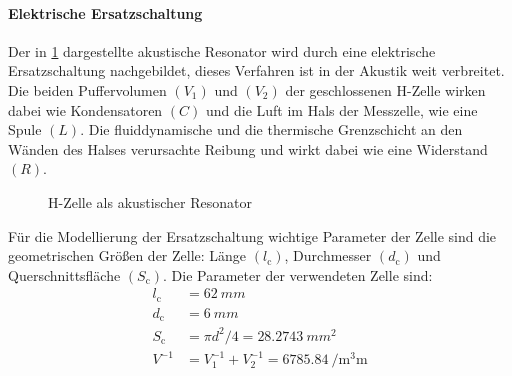 \paragraph{Elektrische Ersatzschaltung}
Der in \cref{fig:AcousticResonator} dargestellte akustische Resonator wird durch eine elektrische Ersatzschaltung nachgebildet, dieses Verfahren ist in der Akustik weit verbreitet.
Die beiden Puffervolumen $(V_1)$ und $(V_2)$ der geschlossenen H-Zelle wirken dabei wie Kondensatoren $(C)$ und die Luft im Hals der Messzelle, wie eine Spule $(L)$.
Die fluiddynamische und die thermische Grenzschicht an den Wänden des Halses verursachte Reibung und wirkt dabei wie eine Widerstand $(R)$.
\begin{figure}
    \centering
    
    \caption{H-Zelle als akustischer Resonator}
    \label{fig:AcousticResonator}
\end{figure}
Für die Modellierung der Ersatzschaltung wichtige Parameter der Zelle sind die geometrischen Größen der Zelle:
Länge $(l_\mathrm{c})$, Durchmesser $(d_\mathrm{c})$ und Querschnittsfläche $(S_\mathrm{c})$.
Die Parameter der verwendeten Zelle sind:
\begin{align*}
  l_\mathrm{c} &= \SI{62}{mm} \\
  d_\mathrm{c} &= \SI{6}{mm} \\
  S_\mathrm{c} &= \pi d^2 / 4 = \SI{28.2743}{mm^2} \\
  V^{-1} &= V_1^{-1} + V_2^{-1} = \SI{6785.84}{\per\cubic\milli\meter}
\end{align*}



